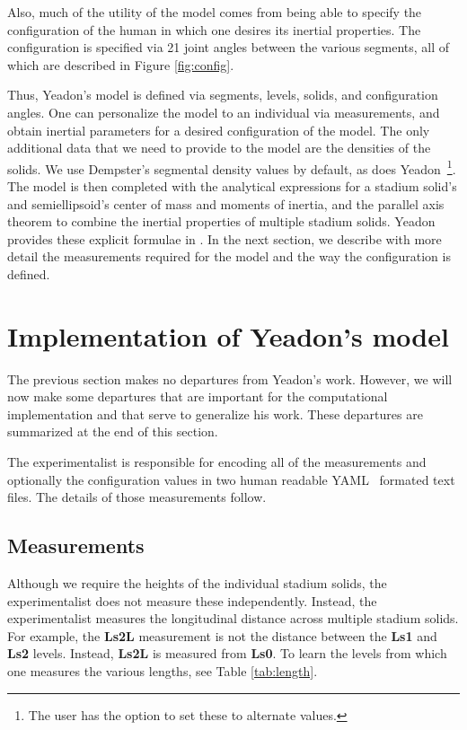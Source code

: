 \documentclass[10pt]{article}
\begin{document}
Also, much of the utility of the model comes from being able to specify the
configuration of the human in which one desires its inertial properties. The
configuration is specified via 21 joint angles between the various segments,
all of which are described in Figure \ref{fig:config}.

Thus, Yeadon's model is defined via segments, levels, solids, and configuration
angles. One can personalize the model to an individual via measurements, and
obtain inertial parameters for a desired configuration of the model. The only
additional data that we need to provide to the model are the densities of the
solids. We use Dempster's segmental density values \cite{Dempster1955} by
default, as does Yeadon~\footnote{The user has the option to set these to
alternate values.}. The model is then completed with the analytical
expressions for a stadium solid's and semiellipsoid's center of mass and
moments of inertia, and the parallel axis theorem to combine the inertial
properties of multiple stadium solids. Yeadon provides these explicit formulae
in \cite{Yeadon1990f}. In the next section, we describe with more detail the
measurements required for the model and the way the configuration is defined.

\section*{Implementation of Yeadon's model}

The previous section makes no departures from Yeadon's work. However, we will
now make some departures that are important for the computational
implementation and that serve to generalize his work. These departures are
summarized at the end of this section.

The experimentalist is responsible for encoding all of the measurements and
optionally the configuration values in two human readable YAML~\cite{YAML2014}
formated text files. The details of those measurements follow.

\subsection*{Measurements}

Although we require the heights of the individual stadium solids, the
experimentalist does not measure these independently. Instead, the
experimentalist measures the longitudinal distance across multiple stadium
solids. For example, the \textbf{Ls2L} measurement is not the distance between
the \textbf{Ls1} and \textbf{Ls2} levels. Instead, \textbf{Ls2L} is measured
from \textbf{Ls0}. To learn the levels from which one measures the various
lengths, see Table \ref{tab:length}.
\end{document}
